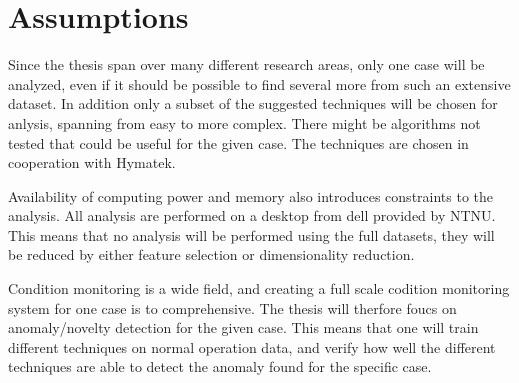     
    

\section{Assumptions}\label{sec:assumptions}
    Since the thesis span over many different research areas, only one case will be analyzed, even if it should be possible to find several more from such an extensive dataset. In addition only a subset of the suggested techniques will be chosen for anlysis, spanning from easy to more complex. There might be algorithms not tested that could be useful for the given case. The techniques are chosen in cooperation with Hymatek. 
    
    Availability of computing power and memory also introduces constraints to the analysis. All analysis are performed on a desktop from dell provided by NTNU. This means that no analysis will be performed using the full datasets, they will be reduced by either feature selection or dimensionality reduction. 
    
    Condition monitoring is a wide field, and creating a full scale codition monitoring system for one case is to comprehensive. The thesis will therfore foucs on anomaly/novelty detection for the given case. This means that one will train different techniques on normal operation data, and verify how well the different techniques are able to detect the anomaly found for the specific case. 
    
